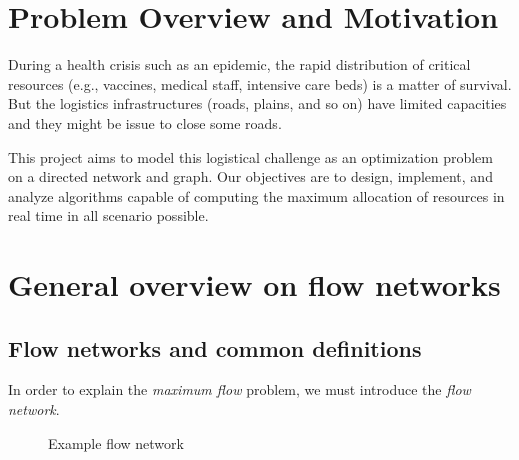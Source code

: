 \documentclass[12pt, openany]{article}
\begin{document}
\clearpage %


\tableofcontents

\newpage

\section*{Problem Overview and Motivation}

During a health crisis such as an epidemic, the rapid distribution of critical resources (e.g., vaccines, medical staff, intensive care beds) is a matter of survival. But the logistics infrastructures (roads, plains, and so on) have limited capacities and they might be issue to close some roads.

This project aims to model this logistical challenge as an optimization problem on a directed network and graph. Our objectives are to design, implement, and analyze algorithms capable of computing the maximum allocation of resources in real time in all scenario possible.

\section{General overview on flow networks}

\subsection{Flow networks and common definitions}

In order to explain the \emph{maximum flow} problem, we must introduce the \emph{flow network}.

\begin{figure}[H]
\centering
{}
\caption{Example flow network}
\end{figure}
\end{document}

